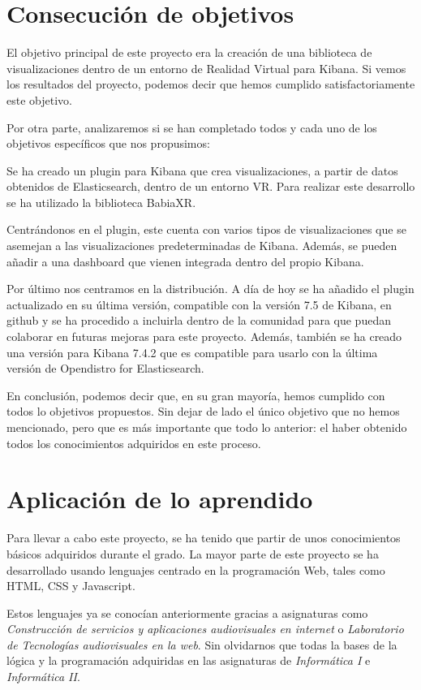 \documentclass[a4paper, 12pt]{book}
\begin{document}
\section{Consecución de objetivos}
\label{sec:objetivoscumplidos}

El objetivo principal de este proyecto era la creación de una biblioteca de visualizaciones dentro de un entorno de Realidad Virtual para Kibana. Si vemos los resultados del proyecto, podemos decir que hemos cumplido satisfactoriamente este objetivo.

Por otra parte, analizaremos si se han completado todos y cada uno de los objetivos específicos que nos propusimos:

Se ha creado un plugin para Kibana que crea visualizaciones, a partir de datos obtenidos de Elasticsearch, dentro de un entorno VR. Para realizar este desarrollo se ha utilizado la biblioteca BabiaXR.

Centrándonos en el plugin, este cuenta con varios tipos de visualizaciones que se asemejan a las visualizaciones predeterminadas de Kibana. Además, se pueden añadir a una dashboard que vienen integrada dentro del propio Kibana.

Por último nos centramos en la distribución. A día de hoy se ha añadido el plugin actualizado en su última versión, compatible con la versión 7.5 de Kibana, en github y se ha procedido a incluirla dentro de la comunidad para que puedan colaborar en futuras mejoras para este proyecto. Además, también se ha creado una versión para Kibana 7.4.2 que es compatible para usarlo con la última versión de Opendistro for Elasticsearch.

En conclusión, podemos decir que, en su gran mayoría, hemos cumplido con todos lo objetivos propuestos. Sin dejar de lado el único objetivo que no hemos mencionado, pero que es más importante que todo lo anterior: el haber obtenido todos los conocimientos adquiridos en este proceso.


\section{Aplicación de lo aprendido}
\label{sec:aprendido}

Para llevar a cabo este proyecto, se ha tenido que partir de unos conocimientos básicos adquiridos durante el grado. La mayor parte de este proyecto se ha desarrollado usando lenguajes centrado en la programación Web, tales como HTML, CSS y Javascript. 

Estos lenguajes ya se conocían anteriormente gracias a asignaturas como \textit{Construcción de servicios y aplicaciones audiovisuales en internet} o \textit{Laboratorio de Tecnologías audiovisuales en la web}. Sin olvidarnos que todas la bases de la lógica y la programación adquiridas en las asignaturas de \textit{Informática I} e \textit{Informática II}. 
\end{document}
